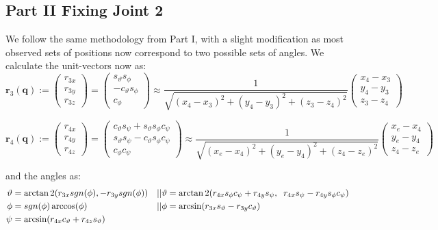 \documentclass[11pt, a4paper]{article}
\begin{document}
    \subsection{Part II \textemdash Fixing Joint 2}
    We follow the same methodology from Part I, with a slight
    modification as most observed sets of positions now correspond
    to two possible sets of angles. We calculate the unit-vectors now as:
    $$
    \textbf{r}_3(\textbf{q}) :=
    \begin{pmatrix}
        r_{3x}\\
        r_{3y}\\
        r_{3z} 
    \end{pmatrix} =
    \begin{pmatrix}
        s_{\vartheta}s_{\phi}\\
       -c_{\vartheta}s_{\phi}\\
        c_{\phi}
    \end{pmatrix} \approx \frac{1}{\sqrt{(x_4 - x_3)^2 + (y_4 - y_3)^2 + (z_3 - z_4)^2}}
    \begin{pmatrix}
        x_4 - x_3\\
        y_4 - y_3\\
        z_3 - z_4
    \end{pmatrix}
    $$

    $$
    \textbf{r}_4(\textbf{q}) :=
    \begin{pmatrix}
        r_{4x}\\
        r_{4y}\\
        r_{4z}
    \end{pmatrix} =
    \begin{pmatrix}
        c_{\vartheta}s_{\psi} + s_{\vartheta}s_{\phi}c_{\psi}\\
        s_{\vartheta}s_{\psi} - c_{\vartheta}s_{\phi}c_{\psi}\\
        c_{\phi}c_{\psi}
    \end{pmatrix} \approx \frac{1}{\sqrt{(x_e - x_4)^2 + (y_e - y_4)^2 + (z_4 - z_e)^2}}
    \begin{pmatrix}
        x_e - x_4\\
        y_e - y_4\\
        z_4 - z_e
    \end{pmatrix}
    $$

    and the angles as:
    \begin{align*}
        \vartheta &= \arctan2(r_{3x}sgn(\phi), -r_{3y}sgn(\phi)) &|| &\vartheta = \arctan2(
         r_{4x}s_{\phi}c_{\psi} + r_{4y}s_{\psi}, \hspace{0.2cm}
         r_{4x}s_{\psi} - r_{4y}s_{\phi}c_{\psi} 
     )\\
        \phi      &= sgn(\phi)\arccos(\phi) &|| &\phi = \arcsin(r_{3x}s_{\vartheta} - r_{3y}c_{\vartheta})\\
        \psi      &= \arcsin(r_{4x}c_{\vartheta} + r_{4z}s_{\vartheta})
    \end{align*}
\end{document}
